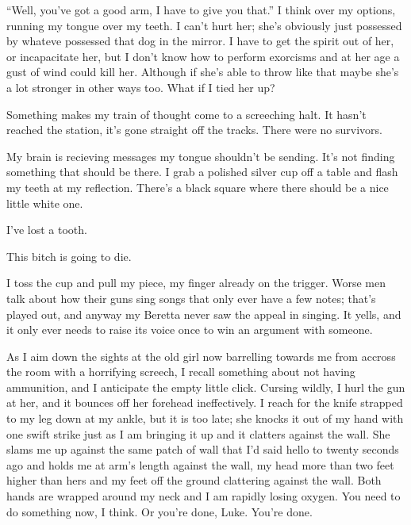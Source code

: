 ``Well, you've got a good arm, I have to give you that.'' I think
over my options, running my tongue over my teeth. I can't hurt her;
she's obviously just possessed by whateve possessed that dog in the
mirror. I have to get the spirit out of her, or incapacitate her,
but I don't know how to perform exorcisms and at her age a gust of
wind could kill her. Although if she's able to throw like that
maybe she's a lot stronger in other ways too. What if I tied her
up?



Something makes my train of thought come to a screeching halt. It
hasn't reached the station, it's gone straight off the tracks.
There were no survivors.



My brain is recieving messages my tongue shouldn't be sending. It's
not finding something that should be there. I grab a polished
silver cup off a table and flash my teeth at my reflection. There's
a black square where there should be a nice little white one.



I've lost a tooth.



This bitch is going to die.



I toss the cup and pull my piece, my finger already on the trigger.
Worse men talk about how their guns sing songs that only ever have
a few notes; that's played out, and anyway my Beretta never saw the
appeal in singing. It yells, and it only ever needs to raise its
voice once to win an argument with someone.



As I aim down the sights at the old girl now barrelling towards me
from accross the room with a horrifying screech, I recall something
about not having ammunition, and I anticipate the empty little
click. Cursing wildly, I hurl the gun at her, and it bounces off
her forehead ineffectively. I reach for the knife strapped to my
leg down at my ankle, but it is too late; she knocks it out of my
hand with one swift strike just as I am bringing it up and it
clatters against the wall. She slams me up against the same patch
of wall that I'd said hello to twenty seconds ago and holds me at
arm's length against the wall, my head more than two feet higher
than hers and my feet off the ground clattering against the wall.
Both hands are wrapped around my neck and I am rapidly losing
oxygen. You need to do something now, I think. Or you're done,
Luke. You're done.




